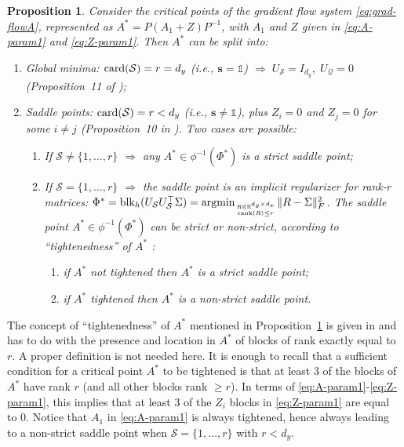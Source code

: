 \documentclass{article}
\newtheorem{proposition}{Proposition}
\def\rank{{\rm rank}}
\def\block{{\rm blk}}
\newcommand{\1}{\mathds{1}}
\newcommand{\benu}{\begin{enumerate}}
\newcommand{\eenu}{\end{enumerate}}
\begin{document}
\begin{proposition}
\label{prop:class-crit-points}
Consider the critical points of the gradient flow system \eqref{eq:grad-flowA}, represented as $ A^\ast = P (A_1 + Z )P^{-1}$, with $ A_1 $ and $ Z$ given in \eqref{eq:A-param1} and \eqref{eq:Z-param1}. Then $A^\ast $ can be split into:
\benu
\item Global minima: $ {\rm card}(\mathcal{S})= r =d_y $ (i.e., $\mathbf{s}=\1$) $  \Longrightarrow \;  U_\mathcal{S} =I_{d_y} , \; U_\mathcal{Q}=0$ (Proposition~11 of \cite{achour2021loss});
\item Saddle points: $ {\rm card}(\mathcal{S})=r<d_y $ (i.e., $ \mathbf{s}\neq \1 $), plus $ Z_i =0 $ and $ Z_j =0 $ for some $ i\neq j $ (Proposition~10 in \cite{achour2021loss}). Two cases are possible:
\benu
\item If $ \mathcal{S} \neq \{ 1, \ldots, r\} $ $ \Longrightarrow $ any $ A^\ast \in \phi^{-1}(\Phi^\ast) $ is a strict saddle point; 

\item If $ \mathcal{S} = \{ 1, \ldots, r\} $ $ \Longrightarrow $ the saddle point is an implicit regularizer for rank-$r$ matrices: $ \Phi^\ast = \block_h(U_\mathcal{S} U_\mathcal{S}^\top \Sigma) = {\rm argmin}_{R\in \mathbb{R}^{d_y \times d_x} \atop \rank(R)\leq r } \| R - \Sigma\|_F^2 $. The saddle point $A^\ast \in \phi^{-1}(\Phi^\ast) $ can be strict or non-strict,
according to ``tightenedness'' of $A^\ast$ \cite{achour2021loss}:
\benu
\item if $ A^\ast $ not tightened then $ A^\ast $ is a strict saddle point;
\item if $ A^\ast $ tightened then $ A^\ast $ is a non-strict saddle point.
\eenu
\eenu
\eenu
\end{proposition}
The concept of ``tightenedness'' of $A^\ast $ mentioned in Proposition~\ref{prop:class-crit-points} is given in \cite{achour2021loss} and has to do with the presence and location in $A^\ast $ of blocks of rank exactly equal to $r$. A proper definition is not needed here. It is enough to recall that a sufficient condition for a critical point $A^\ast$ to be tightened is that at least 3 of the blocks of $ A^\ast $ have rank $r$ (and all other blocks rank $ \geq r $). In terms of \eqref{eq:A-param1}-\eqref{eq:Z-param1}, this implies that at least 3 of the $ Z_i $ blocks in \eqref{eq:Z-param1} are equal to $0$.
Notice that $A_1 $ in \eqref{eq:A-param1} is always tightened, hence always leading to a non-strict saddle point when $  \mathcal{S} = \{ 1, \ldots, r\} $ with $ r<d_y$.
\end{document}
